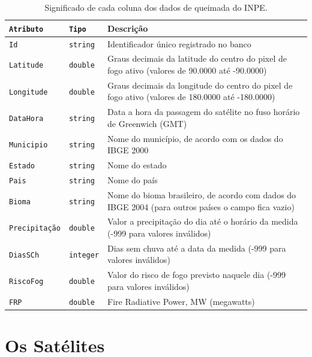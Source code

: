 \documentclass[cic,tc]{iiufrgs}
\begin{document}
\begin{table}[htbp]
\centering
\caption{Significado de cada coluna dos dados de queimada do INPE.}
\begin{tabular}{@{}llp{9cm}@{}}
 \toprule
 \texttt{Atributo} & \texttt{Tipo} & Descrição \\
 \midrule
 \texttt{Id} & \texttt{string} & Identificador único registrado no banco \\
 \texttt{Latitude} & \texttt{double} & Graus decimais da latitude do centro 
                     do pixel de fogo ativo (valores de 90.0000 até -90.0000) \\ 
 \texttt{Longitude} & \texttt{double} & Graus decimais da longitude do centro 
                     do pixel de fogo ativo (valores de 180.0000 até -180.0000) \\  
 \texttt{DataHora} & \texttt{string} & Data a hora da passagem do satélite no fuso 
                     horário de Greenwich (GMT) \\   
 \texttt{Municipio} & \texttt{string} & Nome do município, de acordo com os dados 
                     do IBGE 2000 \\
 \texttt{Estado} & \texttt{string} & Nome do estado \\
 \texttt{Pais} & \texttt{string} & Nome do país \\  
 \texttt{Bioma} & \texttt{string} & Nome do bioma brasileiro, de acordo com 
                     dados do IBGE 2004 (para outros países o campo fica vazio) \\
 \texttt{Precipitação} & \texttt{double} & Valor a precipitação do dia até 
                     o horário da medida (-999 para valores inválidos) \\
 \texttt{DiasSCh} & \texttt{integer} & Dias sem chuva até a data da medida 
                     (-999 para valores inválidos) \\
 \texttt{RiscoFog} & \texttt{double} & Valor do risco de fogo previsto naquele dia 
                     (-999 para valores inválidos) \\
 \texttt{FRP} & \texttt{double} & Fire Radiative Power, MW (megawatts) \\
 \bottomrule
\end{tabular}
\label{table:inpeColumns}
\end{table}

\section{Os Satélites}
\end{document}
